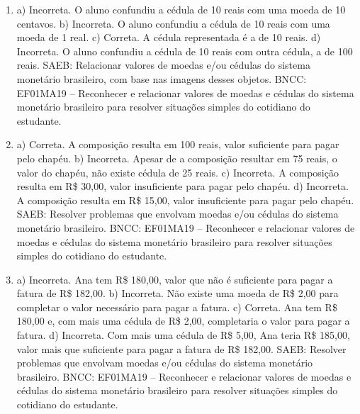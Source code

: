 \begin{enumerate}
\item
a) Incorreta. O aluno confundiu a cédula de 10 reais com uma moeda de 10 centavos.
b) Incorreta. O aluno confundiu a cédula de 10 reais com uma moeda de 1 real.
c) Correta. A cédula representada é a de 10 reais.
d) Incorreta. O aluno confundiu a cédula de 10 reais com outra cédula, a de 100 reais.
SAEB: Relacionar valores de moedas e/ou cédulas do sistema
monetário brasileiro, com base nas imagens desses objetos.
BNCC: EF01MA19 -- Reconhecer e relacionar valores de moedas e cédulas do
sistema monetário brasileiro para resolver situações simples do
cotidiano do estudante.

\item
a) Correta. A composição resulta em 100 reais, valor suficiente para pagar pelo chapéu.
b) Incorreta. Apesar de a composição resultar em 75 reais, o valor do chapéu, não existe cédula de 25 reais.
c) Incorreta. A composição resulta em R\$ 30,00, valor insuficiente para pagar pelo chapéu.
d) Incorreta. A composição resulta em R\$ 15,00, valor insuficiente para pagar pelo chapéu.
SAEB: Resolver problemas que envolvam moedas e/ou cédulas do
sistema monetário brasileiro.
BNCC: EF01MA19 -- Reconhecer e relacionar valores de moedas e cédulas do
sistema monetário brasileiro para resolver situações simples do
cotidiano do estudante.

\item
a) Incorreta. Ana tem R\$ 180,00, valor que não é suficiente para pagar a fatura de R\$ 182,00.
b) Incorreta. Não existe uma moeda de R\$ 2,00 para completar o valor necessário para pagar a fatura.
c) Correta. Ana tem R\$ 180,00 e, com mais uma cédula de R\$ 2,00, completaria o valor para pagar a fatura.
d) Incorreta. Com mais uma cédula de R\$ 5,00, Ana teria R\$ 185,00, valor mais que suficiente para pagar a fatura de R\$ 182,00.
SAEB: Resolver problemas que envolvam moedas e/ou cédulas do
sistema monetário brasileiro.
BNCC: EF01MA19 -- Reconhecer e relacionar valores de moedas e cédulas do
sistema monetário brasileiro para resolver situações simples do
cotidiano do estudante.
\end{enumerate}


